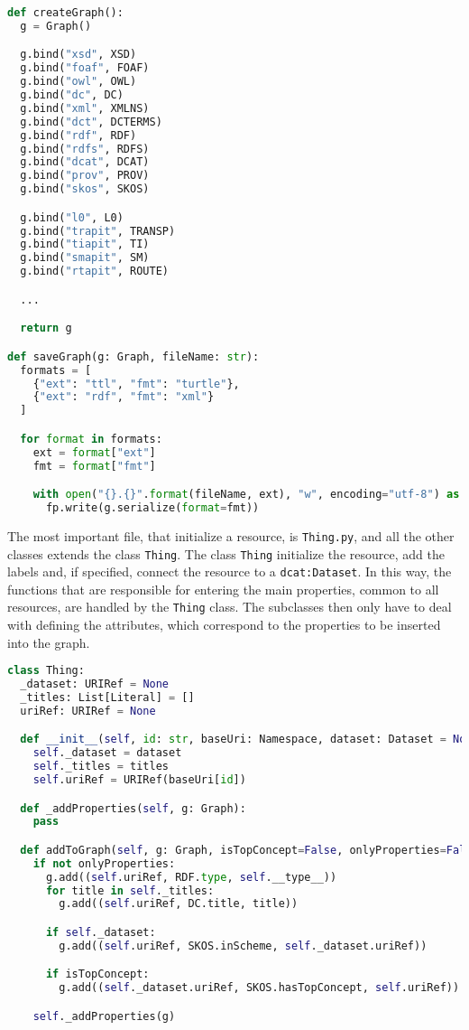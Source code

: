\begin{lstlisting}[language=python,caption={Part of the \_\_init\_\_.py file that contains the two functions for creating and saving the graph.},label=code:init-ontopia-py]
def createGraph():
  g = Graph()

  g.bind("xsd", XSD)
  g.bind("foaf", FOAF)
  g.bind("owl", OWL)
  g.bind("dc", DC)
  g.bind("xml", XMLNS)
  g.bind("dct", DCTERMS)
  g.bind("rdf", RDF)
  g.bind("rdfs", RDFS)
  g.bind("dcat", DCAT)
  g.bind("prov", PROV)
  g.bind("skos", SKOS)

  g.bind("l0", L0)
  g.bind("trapit", TRANSP)
  g.bind("tiapit", TI)
  g.bind("smapit", SM)
  g.bind("rtapit", ROUTE)

  ...

  return g

def saveGraph(g: Graph, fileName: str):
  formats = [
    {"ext": "ttl", "fmt": "turtle"},
    {"ext": "rdf", "fmt": "xml"}
  ]

  for format in formats:
    ext = format["ext"]
    fmt = format["fmt"]

    with open("{}.{}".format(fileName, ext), "w", encoding="utf-8") as fp:
      fp.write(g.serialize(format=fmt))
\end{lstlisting}

The most important file, that initialize a resource, is \verb#Thing.py#, and all the other classes extends the class \verb#Thing#. The class \verb#Thing# initialize the resource, add the labels and, if specified, connect the resource to a \verb#dcat:Dataset#. In this way, the functions that are responsible for entering the main properties, common to all resources, are handled by the \verb#Thing# class. The subclasses then only have to deal with defining the attributes, which correspond to the properties to be inserted into the graph.

\begin{lstlisting}[language=python,caption={The ontopia-py's Thing class.},label=code:thing-ontopia-py]
class Thing:
  _dataset: URIRef = None
  _titles: List[Literal] = []
  uriRef: URIRef = None

  def __init__(self, id: str, baseUri: Namespace, dataset: Dataset = None, titles: List[Literal] = []):
    self._dataset = dataset
    self._titles = titles
    self.uriRef = URIRef(baseUri[id])

  def _addProperties(self, g: Graph):
    pass

  def addToGraph(self, g: Graph, isTopConcept=False, onlyProperties=False):
    if not onlyProperties:
      g.add((self.uriRef, RDF.type, self.__type__))
      for title in self._titles:
        g.add((self.uriRef, DC.title, title))

      if self._dataset:
        g.add((self.uriRef, SKOS.inScheme, self._dataset.uriRef))

      if isTopConcept:
        g.add((self._dataset.uriRef, SKOS.hasTopConcept, self.uriRef))

    self._addProperties(g)
\end{lstlisting}


